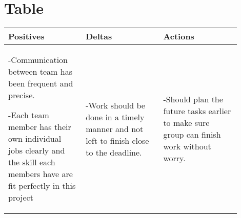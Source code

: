 \documentclass[letterpaper, 10pt,titlepage]{article}
\begin{document}
\section{Table}
\begin{tabular}{|p{0.3\linewidth}|p{0.3\linewidth}|p{0.3\linewidth}|}
\hline
\centering Positives &
\centering Deltas &   
\centering Actions \tabularnewline
\hline
-Communication between team has been frequent and precise. 

\vspace{0.2cm}

-Each team member has their own individual jobs clearly and the skill each members have are fit perfectly in this project& 

-Work should be done in a timely manner and not left to finish close to the deadline.& 

-Should plan the future tasks earlier to make sure group can finish work without worry.
\tabularnewline
\hline
\end{tabular}
\end{document}
